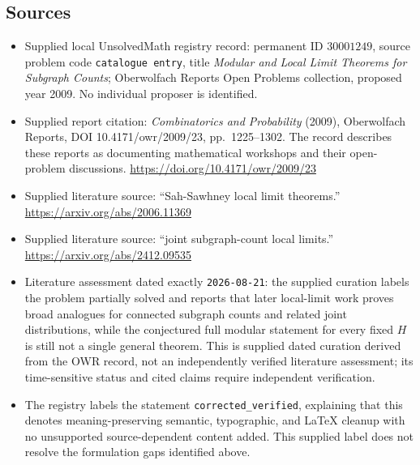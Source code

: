 \documentclass[11pt]{article}
\begin{document}
\subsection{Sources}
\begin{itemize}
\item Supplied local UnsolvedMath registry record: permanent ID \(30001249\), source problem code \texttt{catalogue entry}, title \emph{Modular and Local Limit Theorems for Subgraph Counts}; Oberwolfach Reports Open Problems collection, proposed year 2009. No individual proposer is identified.
\item Supplied report citation: \emph{Combinatorics and Probability} (2009), Oberwolfach Reports, DOI 10.4171/owr/2009/23, pp.\ 1225--1302. The record describes these reports as documenting mathematical workshops and their open-problem discussions. \url{https://doi.org/10.4171/owr/2009/23}
\item Supplied literature source: ``Sah-Sawhney local limit theorems.'' \url{https://arxiv.org/abs/2006.11369}
\item Supplied literature source: ``joint subgraph-count local limits.'' \url{https://arxiv.org/abs/2412.09535}
\item Literature assessment dated exactly \texttt{2026-08-21}: the supplied curation labels the problem partially solved and reports that later local-limit work proves broad analogues for connected subgraph counts and related joint distributions, while the conjectured full modular statement for every fixed \(H\) is still not a single general theorem. This is supplied dated curation derived from the OWR record, not an independently verified literature assessment; its time-sensitive status and cited claims require independent verification.
\item The registry labels the statement \texttt{corrected\_verified}, explaining that this denotes meaning-preserving semantic, typographic, and LaTeX cleanup with no unsupported source-dependent content added. This supplied label does not resolve the formulation gaps identified above.
\end{itemize}
\end{document}
